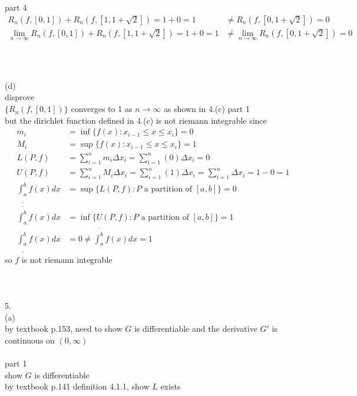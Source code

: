 \documentclass[12pt, border = 4pt, multi]{article} %
\begin{document}
\\
\\
part 4
\begin{align*}
R_n(f, [0, 1]) + R_n(f, [1, 1 + \sqrt{2}]) = 1 + 0 = 1 &\not= R_n(f, [0, 1 + \sqrt{2}]) = 0\\
\lim_{n \rightarrow \infty} R_n(f, [0, 1]) + R_n(f, [1, 1 + \sqrt{2}]) = 1 + 0 = 1 &\not= \lim_{n \rightarrow \infty}  R_n(f, [0, 1 + \sqrt{2}]) = 0\\
\end{align*}
\\
\\
\\
(d)\\
disprove\\
$\{R_n(f, [0, 1])\}$ converges to 1 as $n \rightarrow \infty$ as shown in 4.(c) part 1\\
but the dirichlet function defined in 4.(c) is not riemann integrable since
\begin{align*}
m_i &= \inf\{f(x): x_{i - 1} \leq x \leq x_i\} = 0\\
M_i &= \sup\{f(x): x_{i - 1} \leq x \leq x_i\} = 1\\
L(P, f) &= \sum_{i = 1} ^ n m_i \Delta x_i = \sum_{i = 1} ^ n (0)\Delta x_i = 0\\
U(P, f) &= \sum_{i = 1} ^ n M_i \Delta x_i = \sum_{i = 1} ^ n (1)\Delta x_i = \sum_{i = 1} ^ n \Delta x_i = 1 - 0 = 1\\
\underline{\int_a ^ b}f(x)dx &= \sup\{L(P, f): P \text{ a partition of }[a, b]\} = 0\\
\overline{\int_a ^ b}f(x)dx &= \inf\{U(P, f): P \text{ a partition of }[a, b]\} = 1\\
\underline{\int_a ^ b}f(x)dx &= 0 \not= \overline{\int_a ^ b}f(x)dx = 1
\end{align*}
so $f$ is not riemann integrable\\
\\
\\
\\
5.\\
(a)\\
by textbook p.153, need to show $G$ is differentiable and the derivative $G'$ is continuous on $(0, \infty)$\\
\\
part 1\\
show $G$ is differentiable\\
by textbook p.141 definition 4.1.1, show $L$ exists
\end{document}
